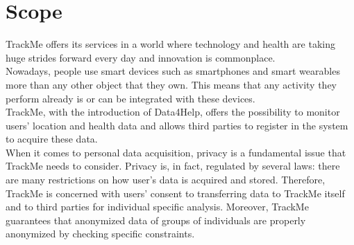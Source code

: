 \documentclass{report}
\begin{document}
		\section{Scope}
			TrackMe offers its services in a world where technology and health are taking huge strides forward every day and innovation is commonplace.\\
Nowadays, people use smart devices such as smartphones and smart wearables more than any other object that they own. This means that any activity they perform already is or can be integrated with these devices.\\
TrackMe, with the introduction of Data4Help, offers the possibility to monitor users’ location and health data and allows third parties to register in the system to acquire these data.\\
When it comes to personal data acquisition, privacy is a fundamental issue that TrackMe needs to consider. Privacy is, in fact, regulated by several laws: there are many restrictions on how user’s data is acquired and stored. Therefore, TrackMe is concerned with users’ consent to transferring data to TrackMe itself and to third parties for individual specific analysis. Moreover, TrackMe guarantees that anonymized data of groups of individuals are properly anonymized by checking specific constraints.\\
\end{document}
